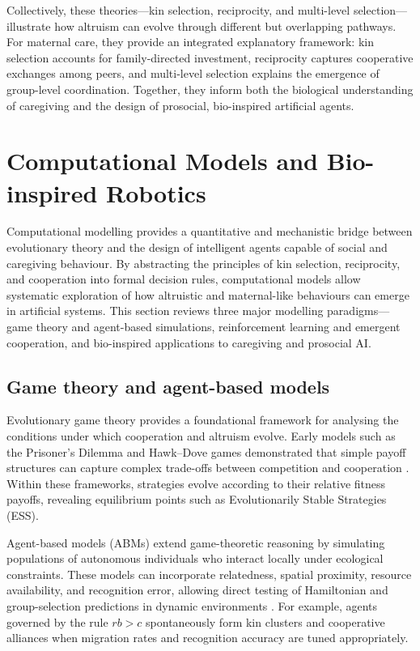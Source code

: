         Collectively, these theories—kin selection, reciprocity, and multi-level selection—illustrate how altruism can evolve through different but overlapping pathways.  For maternal care, they provide an integrated explanatory framework: kin selection accounts for family-directed investment, reciprocity captures cooperative exchanges among peers, and multi-level selection explains the emergence of group-level coordination.  Together, they inform both the biological understanding of caregiving and the design of prosocial, bio-inspired artificial agents.
        

\section{Computational Models and Bio-inspired Robotics}
Computational modelling provides a quantitative and mechanistic bridge between evolutionary theory and the design of intelligent agents capable of social and caregiving behaviour.  By abstracting the principles of kin selection, reciprocity, and cooperation into formal decision rules, computational models allow systematic exploration of how altruistic and maternal-like behaviours can emerge in artificial systems.  This section reviews three major modelling paradigms—game theory and agent-based simulations, reinforcement learning and emergent cooperation, and bio-inspired applications to caregiving and prosocial AI.

    \subsection{Game theory and agent-based models}
        Evolutionary game theory provides a foundational framework for analysing the conditions under which cooperation and altruism evolve.  Early models such as the Prisoner’s Dilemma and Hawk–Dove games demonstrated that simple payoff structures can capture complex trade-offs between competition and cooperation \cite{maynardsmith1973, nowak2004}.  Within these frameworks, strategies evolve according to their relative fitness payoffs, revealing equilibrium points such as Evolutionarily Stable Strategies (ESS).
        
        Agent-based models (ABMs) extend game-theoretic reasoning by simulating populations of autonomous individuals who interact locally under ecological constraints.  These models can incorporate relatedness, spatial proximity, resource availability, and recognition error, allowing direct testing of Hamiltonian and group-selection predictions in dynamic environments \cite{wilensky1999, west2011}.  For example, agents governed by the rule $r b > c$ spontaneously form kin clusters and cooperative alliances when migration rates and recognition accuracy are tuned appropriately.  
        
